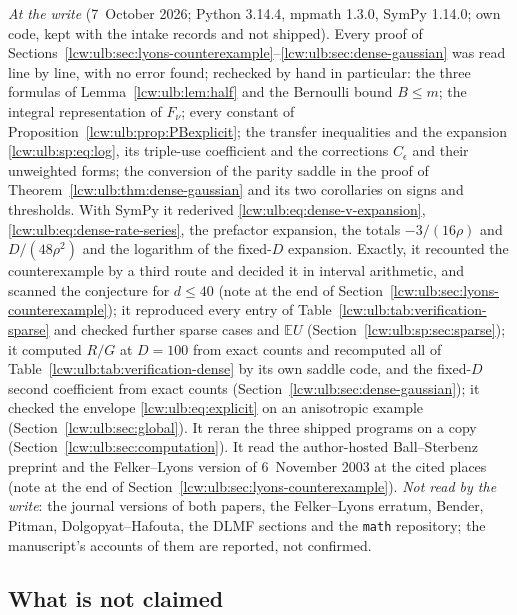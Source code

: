 \documentclass[11pt,letterpaper]{article}
\theoremstyle{remark}\newtheorem{remark}[theorem]{Remark}
\newcommand{\E}{\mathbb E}\newcommand{\Pp}{\mathbb P}
\begin{document}
\emph{At the write} (7~October 2026; Python 3.14.4, mpmath 1.3.0, SymPy 1.14.0;
own code, kept with the intake records and not shipped). Every proof of
Sections~\ref{lcw:ulb:sec:lyons-counterexample}--\ref{lcw:ulb:sec:dense-gaussian}
was read line by line, with no error found; rechecked by hand in particular:
the three formulas of Lemma~\ref{lcw:ulb:lem:half} and the Bernoulli bound
$B\le m$; the integral representation of $F_\nu$; every constant of
Proposition~\ref{lcw:ulb:prop:PBexplicit}; the transfer
inequalities and the expansion \eqref{lcw:ulb:sp:eq:log}, its triple-use
coefficient and the corrections $C_\epsilon$ and their unweighted forms;
the conversion of the parity saddle in the proof of
Theorem~\ref{lcw:ulb:thm:dense-gaussian} and its two corollaries on signs
and thresholds. With SymPy it rederived
\eqref{lcw:ulb:eq:dense-v-expansion}, \eqref{lcw:ulb:eq:dense-rate-series}, the
prefactor expansion, the totals $-3/(16\rho)$ and $D/(48\rho^2)$ and the
logarithm of the fixed-$D$ expansion. Exactly, it recounted the
counterexample by a third route and decided it in interval arithmetic, and
scanned the conjecture for $d\le40$ (note at the end of
Section~\ref{lcw:ulb:sec:lyons-counterexample}); it reproduced every entry
of Table~\ref{lcw:ulb:tab:verification-sparse} and checked further sparse
cases and $\E U$ (Section~\ref{lcw:ulb:sp:sec:sparse}); it computed $R/G$ at
$D=100$ from exact counts and recomputed all of
Table~\ref{lcw:ulb:tab:verification-dense} by its own saddle code, and the
fixed-$D$ second coefficient from exact counts
(Section~\ref{lcw:ulb:sec:dense-gaussian}); it checked the envelope
\eqref{lcw:ulb:eq:explicit} on an anisotropic example
(Section~\ref{lcw:ulb:sec:global}). It reran the three shipped programs on a
copy (Section~\ref{lcw:ulb:sec:computation}). It read the author-hosted
Ball--Sterbenz preprint and the Felker--Lyons version of 6~November 2003 at
the cited places (note at the end of
Section~\ref{lcw:ulb:sec:lyons-counterexample}). \emph{Not read by the
write}: the journal versions of both papers, the Felker--Lyons erratum,
Bender, Pitman, Dolgopyat--Hafouta, the DLMF sections and the \texttt{math}
repository; the manuscript's accounts of them are reported, not confirmed.

\subsection{What is not claimed}\label{lcw:ulb:sec:nonclaims}
\end{document}

